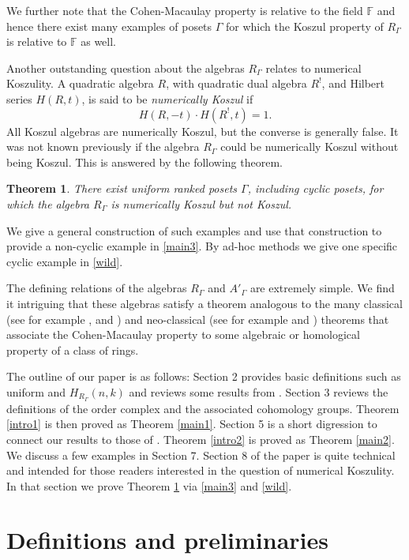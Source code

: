 \documentclass[11pt,righttag]{amsart}
\newtheorem{thm}{Theorem}[section]
\theoremstyle{definition}
\begin{document}
We further note that the Cohen-Macaulay property is relative to the field ${{\mathbb F}}$ and hence there exist many examples of posets $\Gamma$ for which the Koszul property of $R_\Gamma$ is relative to ${{\mathbb F}}$ as well. 

Another outstanding question about the algebras $R_\Gamma$ relates to numerical Koszulity.  A quadratic algebra $R$, with quadratic dual algebra $R^!$, and Hilbert series $H(R,t)$, is said to be {\it numerically Koszul} if
$$H(R,-t)\cdot H(R^!,t) = 1.$$  
All Koszul algebras are numerically Koszul, but the converse is generally false.  It was not known previously if the algebra 
$R_\Gamma$ could be numerically Koszul without being Koszul.  This is answered by the following theorem.

\begin{thm}\label{intro3}
There exist uniform ranked posets $\Gamma$, including cyclic posets, for which the algebra $R_\Gamma$ is numerically Koszul but 
not Koszul.
\end{thm}

We give a general construction of such examples and use that construction to provide a non-cyclic example in \ref{main3}.  By 
ad-hoc methods we give one specific cyclic example in \ref{wild}.  

\medskip
The defining relations of the algebras $R_\Gamma$ and $A'_\Gamma$  are extremely simple. We find it intriguing that these algebras 
satisfy a theorem analogous to the many classical (see for example \cite{BGSsurvey}, \cite{Reisner} and \cite{Stanley75}) and 
neo-classical (see for example \cite{Polo} and \cite{Woodcock}) theorems that associate the Cohen-Macaulay property to some algebraic 
or homological property of a class of rings.  

The outline of our paper is as follows:  Section 2 provides basic definitions such as uniform and 
$H_{R_\Gamma}(n,k)$ and reviews some results from \cite{CPS}.  Section 3 reviews the definitions of the order complex and the 
associated cohomology groups. Theorem \ref{intro1} is then proved as Theorem \ref{main1}.  Section 5 is a short digression to 
connect our results to those of \cite{RSW4}.  Theorem \ref{intro2} is proved as Theorem \ref{main2}.  We discuss a few  
examples in Section 7. Section 8 of the paper is quite technical and intended for those readers interested in the question of numerical 
Koszulity.  In that section we prove Theorem \ref{intro3} via \ref{main3} and \ref{wild}.
 
 
\section{Definitions and preliminaries}
\end{document}

